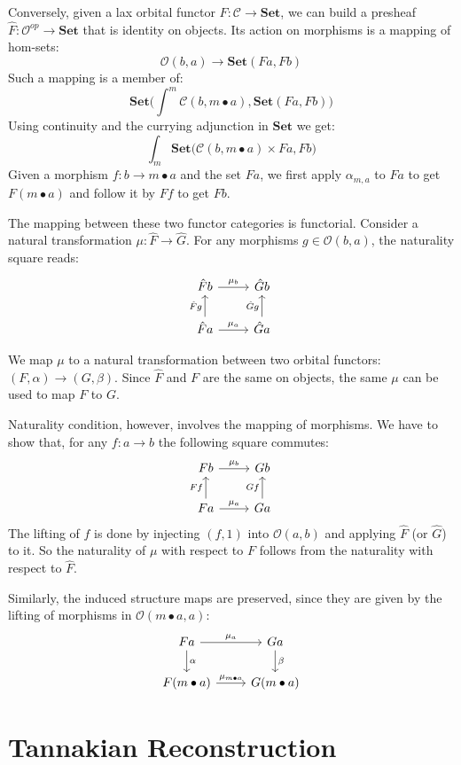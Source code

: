 \documentclass[11pt]{amsart}
\newcommand{\cat}[1]{\mathcal{#1}}%
\newcommand{\Cat}[1]{\mathbf{#1}}%
\newcommand{\Set}{\Cat{Set}}
\begin{document}
Conversely, given a lax orbital functor $F \colon \cat C \to \Set$, we can build a presheaf $\hat F \colon \cat O^{op} \to \Set$ that is identity on objects. Its action on morphisms is a mapping of hom-sets:
\[ \cat O (b, a) \to \Set (F a, F b) \]
Such a mapping is a member of:
\[ \Set \big (\int^m \cat C (b, m \bullet a), \Set (F a, F b) \big) \]
Using continuity and the currying adjunction in $\Set$ we get:
\[ \int_m \Set \big ( \cat C (b, m \bullet a) \times F a, F b \big) \]
Given a morphism $f \colon b \to m \bullet a$ and the set $F a$, we first apply $\alpha_{m, a}$ to $F a$ to get $F (m \bullet a)$ and follow it by $F f$ to get $F b$.

The mapping between these two functor categories is functorial. Consider a natural transformation $\mu \colon \hat F \to \hat G$. For any morphisms $g \in \cat O(b, a)$, the naturality square reads:
\[
\begin{tikzcd}
\hat F b
\arrow[r, "\mu_b"]
& \hat G b
\\
\hat F a
\arrow[u, "\hat F g"]
\arrow[r, "\mu_a"]
& \hat G a
\arrow[u, "\hat G g"]
\end{tikzcd}
\]

We map $\mu$ to a natural transformation between two orbital functors: $(F, \alpha) \to (G, \beta)$. Since $\hat F$ and $F$ are the same on objects, the same $\mu$ can be used to map $F$ to $G$. 

Naturality condition, however, involves the mapping of morphisms. We have to show that, for any $f \colon a \to b$ the following square commutes:
\[
\begin{tikzcd}
F b
\arrow[r, "\mu_b"]
& G b
\\
F a
\arrow[u, "F f"]
\arrow[r, "\mu_a"]
&  G a
\arrow[u, "G f"]
\end{tikzcd}
\]
The lifting of $f$ is done by injecting $(f, 1)$ into $\cat O(a, b)$ and applying $\hat F$ (or $\hat G$) to it. So the naturality of $\mu$ with respect to $F$ follows from the naturality with respect to $\hat F$.

Similarly, the induced structure maps are preserved, since they are given by the lifting of morphisms in $\cat O(m \bullet a, a)$:
\[
\begin{tikzcd}
F a
\arrow[r, "\mu_a"]
\arrow[d, "\alpha"]
& G a
\arrow[d, "\beta"]
\\ F (m \bullet a) 
\arrow[r, "\mu_{m \bullet a}"]
& G (m \bullet a)
\end{tikzcd}
\]

\section{Tannakian Reconstruction}
\end{document}
